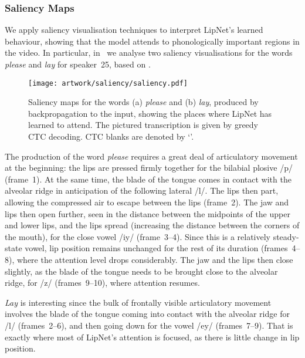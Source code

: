 \documentclass{article}
\begin{document}
\subsubsection{Saliency Maps}

We apply saliency visualisation techniques to interpret LipNet's learned behaviour, showing that the model attends to phonologically important regions in the video. In particular, in~ we analyse two saliency visualisations for the words \textit{please} and \textit{lay} for speaker~25, based on \cite{ashby2013understanding}.  

\begin{figure}[htb]
	\vspace{-0.5em}
    \centering
    \texttt{[image: artwork/saliency/saliency.pdf]}
    \vspace{-1.6em}
    \caption{Saliency maps for the words (a) \textit{please} and (b) \textit{lay}, produced by backpropagation to the input, showing the places where LipNet has learned to attend. The pictured transcription is given by greedy CTC decoding. CTC blanks are denoted by `\textvisiblespace'.}
    \label{fig:saliency}
	\vspace{-0.5em}
\end{figure}

The production of the word \textit{please} requires a great deal of articulatory movement at the beginning: the lips are pressed firmly together for the bilabial plosive /p/ (frame~1). At the same time, the blade of the tongue comes in contact with the alveolar ridge in anticipation of the following lateral /l/. The lips then part, allowing the compressed air to escape between the lips (frame~2). The jaw and lips then open further, seen in the distance between the midpoints of the upper and lower lips, and the lips spread (increasing the distance between the corners of the mouth), for the close vowel /iy/ (frame~3--4).  Since this is a relatively steady-state vowel,  lip position remains unchanged for the rest of its duration (frames~4--8), where the attention level drops considerably. The jaw and the lips then close slightly, as the blade of the tongue needs to be brought close to the alveolar ridge, for /z/ (frames~9--10), where attention resumes. 

\textit{Lay} is interesting since the bulk of frontally visible articulatory movement involves the blade of the tongue coming into contact with the alveolar ridge for /l/ (frames~2--6), and then going down for the vowel /ey/ (frames~7--9). That is exactly where most of LipNet's attention is focused, as there is little change in lip position. 
\end{document}
